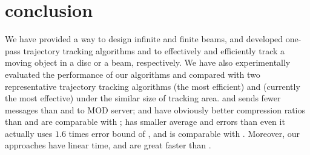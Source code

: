 
\section{conclusion}
\label{sec-conclusion}

We have provided a way to design infinite and finite beams, and developed one-pass trajectory tracking algorithms \citt and \bitt to effectively and efficiently track a moving object in a disc or a beam, respectively.
We have also experimentally evaluated the performance of our algorithms \citt and \bitt compared with two representative trajectory tracking algorithms \ldrh (the most efficient) and \grts (currently the most effective) under the similar size of tracking area. 
\citt and \bitt sends fewer messages than \grts and \ldrh to MOD server;
\citt and \bitt have obviously better compression ratios than \ldrh and are comparable with \grts;
\bitt has smaller average \ped and \sed errors than \grts even it actually uses $1.6$ times \sed error bound of \grts, and \citt is comparable with \grts.
Moreover, our approaches have linear time, and are great faster than \grts.

